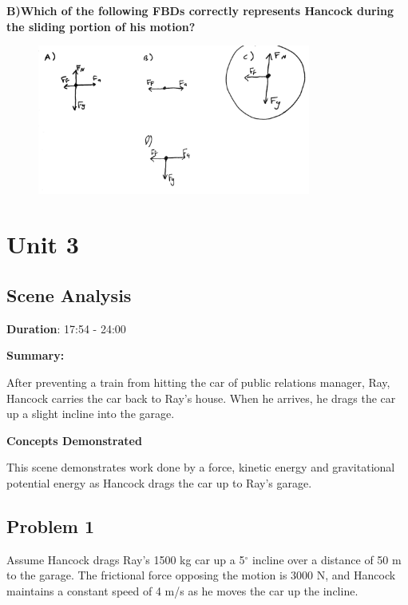 \documentclass[a4paper,12pt]{article}
\begin{document}
\noindent\textbf{B)Which of the following FBDs correctly represents Hancock during the sliding portion of his motion? } \\


\begin{figure}[H]
    \centering
    \includegraphics[width=0.8\textwidth]{U2_P2_B.jpg} %
\end{figure}

\newpage


\section{Unit 3}

\vspace{-0.5cm}
\singlespacing

\subsection{Scene Analysis}

\textbf{Duration}: 17:54 - 24:00

\vspace{0.3cm}
\noindent\textbf{Summary:} \par
After preventing a train from hitting the car of public relations manager, Ray, Hancock carries the car back to Ray's house. When he arrives, he drags the car up a slight incline into the garage. \\
\par


\vspace{0.3cm}
\noindent\textbf{Concepts Demonstrated} \par
This scene demonstrates work done by a force, kinetic energy and gravitational potential energy as Hancock drags the car up to Ray's garage.  

\subsection{Problem 1}
Assume Hancock drags Ray's 1500 kg car up a 5$^\circ$ incline over a distance of 50 m to the garage. The frictional force opposing the motion is 3000 N, and Hancock maintains a constant speed of 4 m/s as he moves the car up the incline. \\
\end{document}

